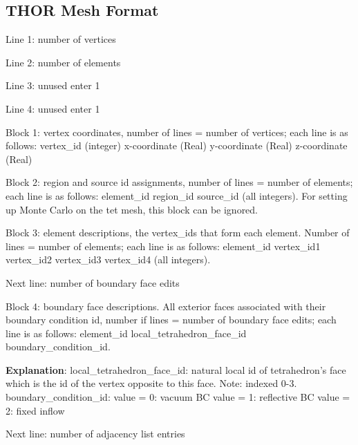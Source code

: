 \subsection{THOR Mesh Format}\label{sec:mesh_format}
Line 1: number of vertices
\vspace{2mm}

\noindent Line 2: number of elements
\vspace{2mm}

\noindent Line 3: unused enter 1
\vspace{2mm}

\noindent Line 4: unused enter 1
\vspace{2mm}

\noindent Block 1: vertex coordinates, number of lines = number of vertices; each line is as follows: vertex\_id (integer) x-coordinate (Real) y-coordinate (Real) z-coordinate (Real)
\vspace{2mm}

\noindent Block 2: region and source id assignments, number of lines = number of elements; each line is as follows: element\_id region\_id source\_id (all integers). For setting up Monte Carlo on the tet mesh, this block can be ignored.
\vspace{2mm}

\noindent Block 3: element descriptions, the vertex\_ids that form each element. Number of lines = number of elements; each line is as follows: element\_id vertex\_id1 vertex\_id2 vertex\_id3 vertex\_id4 (all integers). 
\vspace{2mm}

\noindent Next line: number of boundary face edits
\vspace{2mm}

\noindent Block 4: boundary face descriptions. All exterior faces associated with their boundary condition id, number if lines = number of boundary face edits; each line is as follows: element\_id local\_tetrahedron\_face\_id boundary\_condition\_id.
\vspace{2mm}

\noindent \textbf{Explanation}: 
local\_tetrahedron\_face\_id: natural local id of tetrahedron’s face which is the id of the vertex opposite to this face. Note: indexed 0-3. 
boundary\_condition\_id:
value = 0: vacuum BC
value = 1: reflective BC
value = 2: fixed inflow
\vspace{2mm}

\noindent Next line: number of adjacency list entries
\vspace{2mm}


